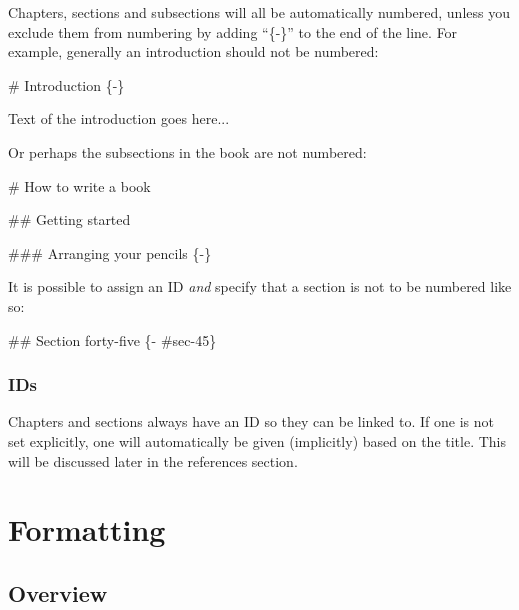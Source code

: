 \documentclass[
]{book}
\newenvironment{Shaded}{\begin{snugshade}}{\end{snugshade}}
\newcommand{\FunctionTok}[1]{\textcolor[rgb]{0.00,0.00,0.00}{#1}}
\newcommand{\NormalTok}[1]{#1}
\begin{document}
Chapters, sections and subsections will all be automatically numbered, unless you exclude them from numbering by adding ``\{-\}'' to the end of the line. For example, generally an introduction should not be numbered:

\begin{Shaded}
\begin{Highlighting}[]
\FunctionTok{\# Introduction \{{-}\}}

\NormalTok{Text of the introduction goes here...}
\end{Highlighting}
\end{Shaded}

Or perhaps the subsections in the book are not numbered:

\begin{Shaded}
\begin{Highlighting}[]
\FunctionTok{\# How to write a book}

\FunctionTok{\#\# Getting started}

\FunctionTok{\#\#\# Arranging your pencils \{{-}\}}
\end{Highlighting}
\end{Shaded}

It is possible to assign an ID \emph{and} specify that a section is not to be numbered like so:

\begin{Shaded}
\begin{Highlighting}[]
\FunctionTok{\#\# Section forty{-}five \{{-} \#sec{-}45\}}
\end{Highlighting}
\end{Shaded}

\hypertarget{ids}{%
\subsection{IDs}\label{ids}}

Chapters and sections always have an ID so they can be linked to. If one is not set explicitly, one will automatically be given (implicitly) based on the title. This will be discussed later in the references section.

\hypertarget{formatting}{%
\chapter{Formatting}\label{formatting}}

\hypertarget{overview}{%
\section{Overview}\label{overview}}
\end{document}
